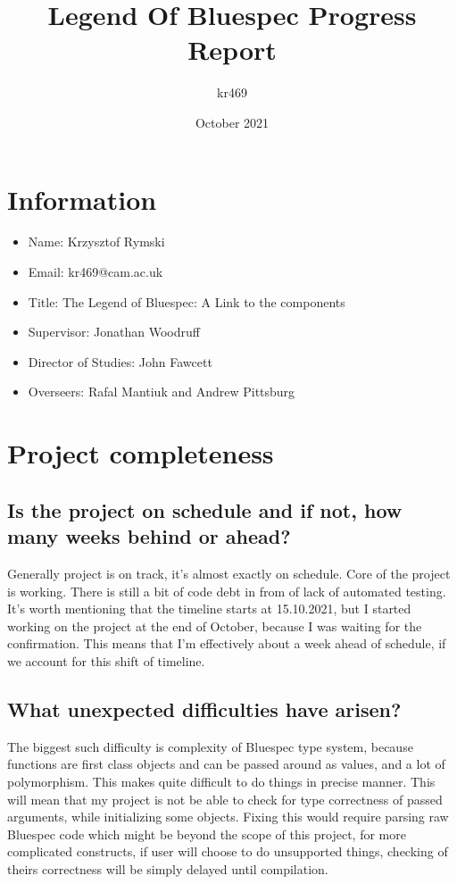 \documentclass[14pt]{article}
\title{Legend Of Bluespec Progress Report}
\author{kr469 }
\date{October 2021}
\begin{document}
    \section{Information}
    \begin{itemize}
        \item Name: Krzysztof Rymski
        \item Email: kr469@cam.ac.uk
        \item Title: The Legend of Bluespec: A Link to the components
        \item Supervisor: Jonathan Woodruff
        \item Director of Studies: John Fawcett
        \item Overseers: Rafal Mantiuk and Andrew Pittsburg
    \end{itemize}
\section{Project completeness}
    \subsection{Is the project on schedule and if not, how many weeks behind or ahead?}    
        Generally project is on track, it's almost exactly on schedule. Core of the project is working. There is still a bit of code debt in from of lack of automated testing. It's worth mentioning that the timeline starts at 15.10.2021, but I started working on the project at the end of October, because I was waiting for the confirmation. This means that I'm effectively about a week ahead of schedule, if we account for this shift of timeline.
    \subsection{What unexpected difficulties have arisen?}
        The biggest such difficulty is complexity of Bluespec type system, because functions are first class objects and can be passed around as values, and a lot of polymorphism. 
        This makes quite difficult to do things in precise manner. 
        This will mean that my project is not be able to check for type correctness of passed arguments, while initializing some objects. 
        Fixing this would require parsing raw Bluespec code which might be beyond the scope of this project, for more complicated constructs, if user will choose to do unsupported things, checking of theirs correctness will be simply delayed until compilation.   
\end{document}

